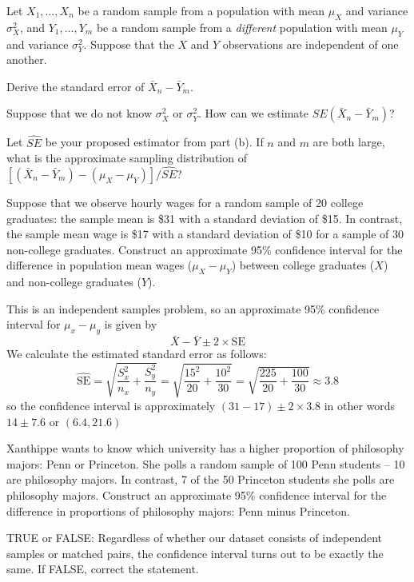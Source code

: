 \documentclass[addpoints,12pt]{exam}
\begin{document}
\begin{questions}
  \question Let $X_1, \dots, X_n$ be a random sample from a population with mean $\mu_X$ and variance $\sigma_X^2$, and $Y_1, \dots, Y_m$ be a random sample from a \emph{different} population with mean $\mu_Y$ and variance $\sigma_Y^2$. Suppose that the $X$ and $Y$ observations are independent of one another.
  \begin{parts}
  \item Derive the standard error of $\bar{X}_n - \bar{Y}_m$. 
  \item Suppose that we do not know $\sigma_X^2$ or $\sigma_Y^2$. How can we estimate $SE(\bar{X}_n - \bar{Y}_m)$?
  \item Let $\widehat{SE}$ be your proposed estimator from part (b). If $n$ and $m$ are both large, what is the approximate sampling distribution of $[(\bar{X}_n - \bar{Y}_m) - (\mu_X - \mu_Y)]/\widehat{SE}$?
  \end{parts}

  \question Suppose that we observe hourly wages for a random sample of 20 college graduates: the sample mean is \$31 with a standard deviation of \$15.
  In contrast, the sample mean wage is \$17 with a standard deviation of \$10 for a sample of 30 non-college graduates.
  Construct an approximate 95\% confidence interval for the difference in population mean wages ($\mu_X - \mu_Y$) between college graduates ($X$) and non-college graduates ($Y$).
  \begin{solution}
    This is an independent samples problem, so an approximate 95\% confidence interval for $\mu_x - \mu_y$ is given by \[
      \bar{X} - \bar{Y} \pm 2 \times \text{SE}
    \]
    We calculate the estimated standard error as follows:
    \[
      \widehat{\text{SE}} = \sqrt{\frac{S_x^2}{n_x} + \frac{S_y^2}{n_y}} = \sqrt{\frac{15^2}{20} + \frac{10^2}{30}} = \sqrt{\frac{225}{20} + \frac{100}{30}} \approx 3.8 
    \] 
    so the confidence interval is approximately $(31 - 17) \pm 2 \times 3.8$ in other words $14 \pm 7.6$ or $(6.4, 21.6)$ 
  \end{solution}


  \question Xanthippe wants to know which university has a higher proportion of philosophy majors: Penn or Princeton.
  She polls a random sample of 100 Penn students -- 10 are philosophy majors.
  In contrast, 7 of the 50 Princeton students she polls are philosophy majors.
  Construct an approximate 95\% confidence interval for the difference in proportions of philosophy majors: Penn minus Princeton.


  \question TRUE or FALSE: Regardless of whether our dataset consists of independent samples or matched pairs, the confidence interval turns out to be exactly the same. If FALSE, correct the statement.


\end{questions}
\end{document}
